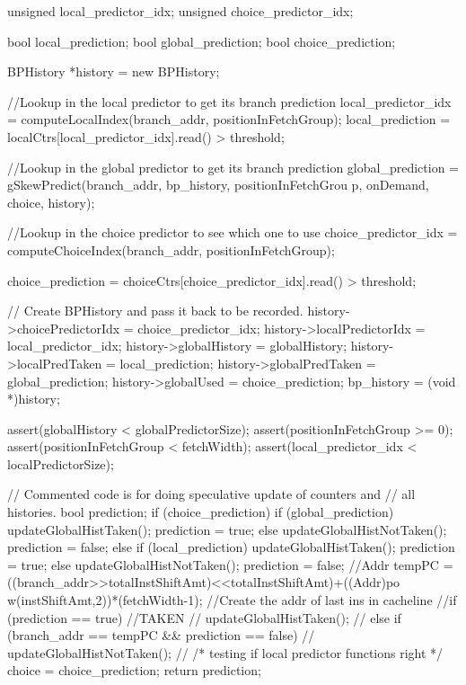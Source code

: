 \begin{DoxyCode}
{
    unsigned local_predictor_idx;
    unsigned choice_predictor_idx;

    bool local_prediction;
    bool global_prediction;
    bool choice_prediction;

    BPHistory *history = new BPHistory;

    //Lookup in the local predictor to get its branch prediction
    local_predictor_idx = computeLocalIndex(branch_addr, positionInFetchGroup);
    local_prediction = localCtrs[local_predictor_idx].read() > threshold;

    //Lookup in the global predictor to get its branch prediction
    global_prediction = gSkewPredict(branch_addr, bp_history, positionInFetchGrou
      p, onDemand, choice, history);

    //Lookup in the choice predictor to see which one to use
    choice_predictor_idx = computeChoiceIndex(branch_addr, positionInFetchGroup);
      
    choice_prediction = choiceCtrs[choice_predictor_idx].read() > threshold;

    // Create BPHistory and pass it back to be recorded.
    history->choicePredictorIdx = choice_predictor_idx;
    history->localPredictorIdx  = local_predictor_idx;
    history->globalHistory = globalHistory;
    history->localPredTaken = local_prediction;
    history->globalPredTaken = global_prediction;
    history->globalUsed = choice_prediction;
    bp_history = (void *)history;

    assert(globalHistory < globalPredictorSize);
    assert(positionInFetchGroup >= 0);
    assert(positionInFetchGroup < fetchWidth);
    assert(local_predictor_idx < localPredictorSize);

    // Commented code is for doing speculative update of counters and
    // all histories.
        bool prediction;
    if (choice_prediction) {
        if (global_prediction) {
                        updateGlobalHistTaken();
                        prediction = true;
        } else {
                        updateGlobalHistNotTaken();
                        prediction = false;
        }
    } else {
        if (local_prediction) {
                        updateGlobalHistTaken();
                        prediction = true;
        } else {
                        updateGlobalHistNotTaken();
                        prediction = false;
        }
    }
  //Addr tempPC = ((branch_addr>>totalInstShiftAmt)<<totalInstShiftAmt)+((Addr)po
      w(instShiftAmt,2))*(fetchWidth-1); //Create the addr of last ins in cacheline
  //if (prediction == true) { //TAKEN
  //    updateGlobalHistTaken();
  //} else if (branch_addr == tempPC && prediction == false) {
  //    updateGlobalHistNotTaken();
  //}
    /* testing if local predictor functions right */
        choice = choice_prediction;
    return prediction;
}
\end{DoxyCode}


